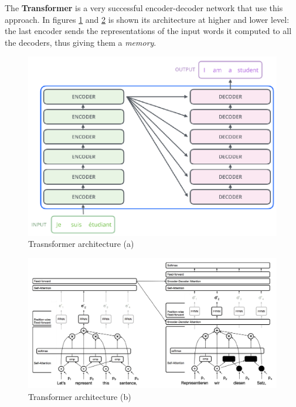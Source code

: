 The \textbf{Transformer} is a very successful encoder-decoder network that use this approach. In figures \ref{fig:seq-transformer-1} and \ref{fig:seq-transformer-2} is shown its architecture at higher and lower level: the last encoder sends the representations of the input words it computed to all the decoders, thus giving them a \textit{memory}.

\begin{minipage}{.4\linewidth}
    \begin{figure}[H]
        \centering
        \includegraphics[width=0.95\linewidth]{images/seq-transformer-1}
        \caption[Trasnsformer architecture (a)]{Trasnsformer architecture (a)}
        \label{fig:seq-transformer-1}
    \end{figure}
\end{minipage}
\begin{minipage}{.6\linewidth}
    \begin{figure}[H]
        \centering
        \includegraphics[width=0.95\linewidth]{images/seq-transformer-2}
        \caption[Transformer architecture (b)]{Transformer architecture (b)}
        \label{fig:seq-transformer-2}
    \end{figure}
\end{minipage}

